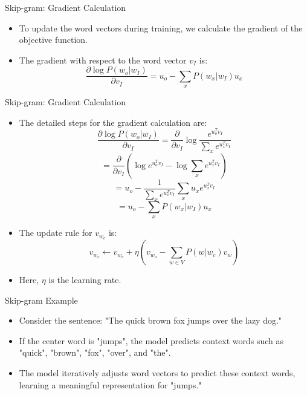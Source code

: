 \documentclass[serif, aspectratio=169]{beamer}
\begin{document}
\begin{frame}{Skip-gram: Gradient Calculation}
    \begin{itemize}
        \item To update the word vectors during training, we calculate the gradient of the objective function.
        \item The gradient with respect to the word vector \(v_I\) is:
        \[
        \frac{\partial \log P(w_o | w_I)}{\partial v_I} = u_o - \sum_x P(w_x | w_I) u_x
        \]
    \end{itemize}
\end{frame}



\begin{frame}{Skip-gram: Gradient Calculation}
    \begin{itemize}
        \item The detailed steps for the gradient calculation are:
        \[
        \frac{\partial \log P(w_o | w_I)}{\partial v_I} = \frac{\partial}{\partial v_I} \log \frac{e^{u_o^T v_I}}{\sum_x e^{u_x^T v_I}}
        \]
        \[
        = \frac{\partial}{\partial v_I} \left( \log e^{u_o^T v_I} - \log \sum_x e^{u_x^T v_I} \right)
        \]
        \[
        = u_o - \frac{1}{\sum_x e^{u_x^T v_I}} \sum_x u_x e^{u_x^T v_I}
        \]
        \[
        = u_o - \sum_x P(w_x | w_I) u_x
        \]
        \item The update rule for \(v_{w_c}\) is:
        \[
        v_{w_c} \leftarrow v_{w_c} + \eta \left( v_{w_o} - \sum_{w \in V} P(w | w_c) v_w \right)
        \]
        \item Here, \(\eta\) is the learning rate.
    \end{itemize}
\end{frame}


\begin{frame}{Skip-gram Example}
    \begin{itemize}
        \item Consider the sentence: "The quick brown fox jumps over the lazy dog."
        \item If the center word is "jumps", the model predicts context words such as "quick", "brown", "fox", "over", and "the".
        \item The model iteratively adjusts word vectors to predict these context words, learning a meaningful representation for "jumps."
    \end{itemize}
\end{frame}
\end{document}
